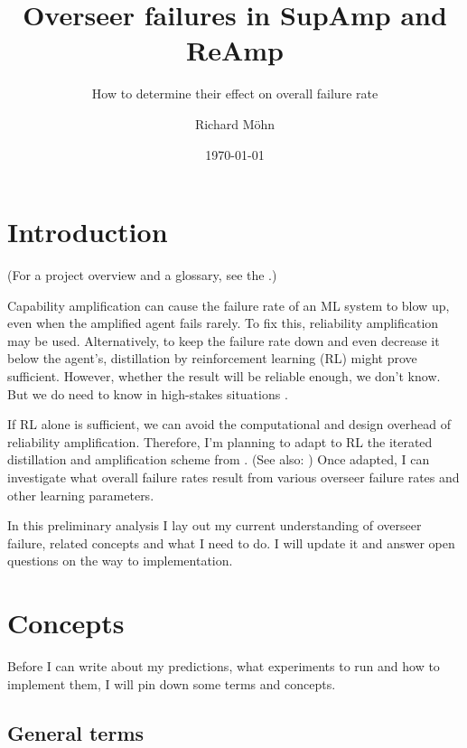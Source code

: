 \documentclass{farlamp}
\title{Overseer failures in SupAmp and ReAmp}
\subtitle{How to determine their effect on overall failure rate}
\author{Richard Möhn}
\date{\today}
\begin{document}
\maketitle
\tableofcontents

\section{Introduction}

(For a project overview and a glossary, see the \FarlampRepo.)

Capability amplification can cause the failure rate of an ML system to blow up,
even when the amplified agent fails rarely. To fix this, reliability
amplification may be used. Alternatively, to keep the failure rate down and even
decrease it below the agent's, distillation by reinforcement learning (RL) might
prove sufficient. However, whether the result will be reliable enough, we don't
know.~\parencite{ChriRelAmp} But we do need to know in high-stakes situations
\parencite[see][]{ChriLearnCata}.

If RL alone is sufficient, we can avoid the computational and design overhead of
reliability amplification. Therefore, I'm planning to adapt to RL the iterated
distillation and amplification scheme from \textcite{CSASupAmp}. (See also:
\SupampReamp) Once adapted, I can investigate what overall failure rates result
from various overseer failure rates and other learning parameters.

In this preliminary analysis I lay out my current understanding of overseer
failure, related concepts and what I need to do. I will update it and answer
open questions on the way to implementation.


\section{Concepts}

Before I can write about my predictions, what experiments to run and how to
implement them, I will pin down some terms and concepts.



\subsection{General terms}
\end{document}
